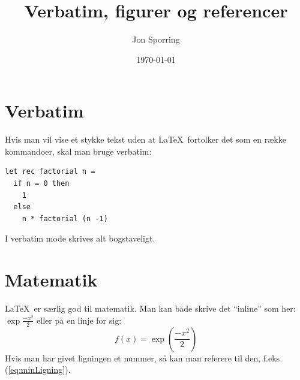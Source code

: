 \documentclass{article}
\title{Verbatim, figurer og referencer}
\author{Jon Sporring}
\date{\today}
\begin{document}
\maketitle

\section{Verbatim}
Hvis man vil vise et stykke tekst uden at \LaTeX\ fortolker det som en
række kommandoer, skal man bruge verbatim:
\begin{verbatim}
let rec factorial n =
  if n = 0 then
    1
  else
    n * factorial (n -1)
\end{verbatim}
I verbatim mode skrives alt bogstaveligt.

\section{Matematik}
\LaTeX\ er særlig god til matematik. Man kan både skrive det "`inline"'
som her: $\exp\frac{-x^2}{2}$ eller på en linje for sig:
\begin{equation}
  \label{eq:minLigning}
  f(x) = \exp\left(\frac{-x^2}{2}\right)
\end{equation}
Hvis man har givet ligningen et nummer, så kan man referere til den,
f.eks. (\ref{eq:minLigning}).
\end{document}
